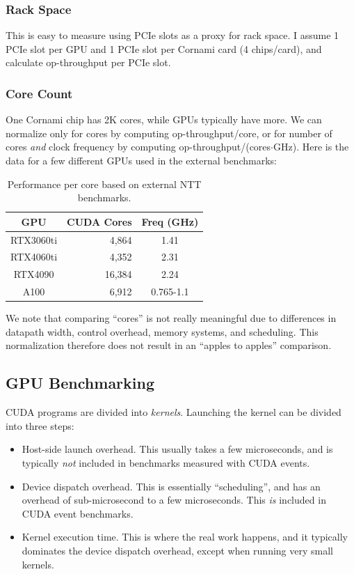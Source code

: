 \documentclass{article}
\begin{document}
	\subsubsection{Rack Space}
	This is easy to measure using PCIe slots as a proxy for rack space. I assume 1 PCIe slot per GPU and 1 PCIe slot per Cornami card (4 chips/card), and calculate op-throughput per PCIe slot.
	
	\subsubsection{Core Count}
	One Cornami chip has 2K cores, while GPUs typically have more. We can normalize only for cores by computing op-throughput/core, or for number of cores \emph{and} clock frequency by computing op-throughput/(cores$\cdot$GHz). Here is the data for a few different GPUs used in the external benchmarks:
	\begin{table}[H]
		\centering
		\renewcommand{\arraystretch}{1.5}
		\caption{Performance per core based on external NTT benchmarks.}
		\label{tbl:nttcorecount}
		\begin{tabular}{ | c | r | S[table-format=1.2] | }
			\hline
			GPU & {CUDA Cores} & {Freq (GHz)} \\
			\hline
			RTX3060ti & 4,864  & 1.41        \\
			RTX4060ti & 4,352  & 2.31        \\
			RTX4090   & 16,384 & 2.24        \\
			A100      & 6,912  & {0.765-1.1} \\
			\hline
		\end{tabular}
	\end{table}
	
	We note that comparing ``cores'' is not really meaningful due to differences in datapath width, control overhead, memory systems, and scheduling. This normalization therefore does not result in an ``apples to apples'' comparison.
	
	\subsection{GPU Benchmarking}
	\label{sec:gpu-bench}
	CUDA programs are divided into \emph{kernels}. Launching the kernel can be divided into three steps:
	\begin{itemize}
		\item Host-side launch overhead. This usually takes a few microseconds, and is typically \emph{not} included in benchmarks measured with CUDA events.
		\item Device dispatch overhead. This is essentially ``scheduling'', and has an overhead of sub-microsecond to a few microseconds. This \emph{is} included in CUDA event benchmarks.
		\item Kernel execution time. This is where the real work happens, and it typically dominates the device dispatch overhead, except when running very small kernels.
	\end{itemize}
	
\end{document}
